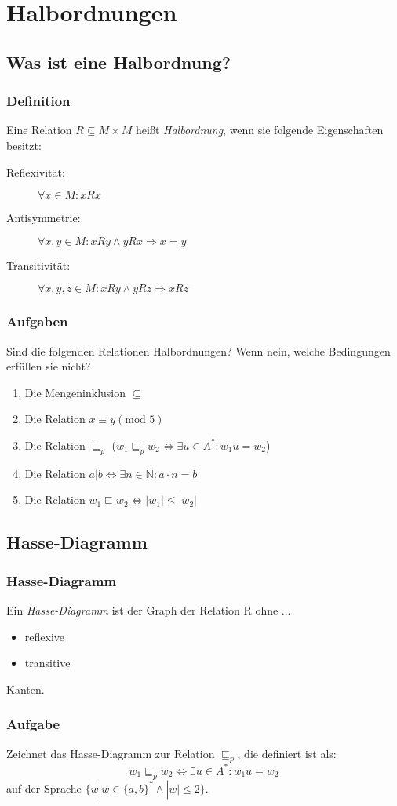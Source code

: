 \section{Halbordnungen}
\subsection{Was ist eine Halbordnung?}
\begin{frame}
	\frametitle{Definition}
	\begin{definition}
		Eine Relation $R\subseteq M\times M$ heißt \emph{Halbordnung}, wenn sie folgende Eigenschaften besitzt:
		\begin{description}
			\item[Reflexivität:] $\forall x \in M: xRx$
			\item[Antisymmetrie:] $\forall x,y \in M: xRy \wedge yRx \Rightarrow x = y$
			\item[Transitivität:] $\forall x,y,z \in M: xRy \wedge yRz \Rightarrow xRz$
		\end{description}
	\end{definition}
\end{frame}
\begin{frame}
	\frametitle{Aufgaben}
		Sind die folgenden Relationen Halbordnungen? Wenn nein, welche Bedingungen erfüllen sie nicht?
		\begin{enumerate}
			\item Die Mengeninklusion $\subseteq$ 
			\item Die Relation $x\equiv y (\text{mod }5)$ 
			\item Die Relation $\sqsubseteq_p$ ($w_1\sqsubseteq_pw_2\iff\exists u\in A^*:w_1u=w_2$) 
			\item Die Relation $a|b \iff \exists n\in \mathbb{N}:a\cdot n=b$ 
			\item Die Relation $w_1\sqsubseteq w_2 \iff |w_1|\leq |w_2|$ 
		\end{enumerate}
\end{frame}
\subsection{Hasse-Diagramm}
\begin{frame}
  \frametitle{Hasse-Diagramm}
	\begin{definition}
		Ein \emph{Hasse-Diagramm} ist der Graph der Relation R ohne $\dots$
    \begin{itemize}
      \item reflexive
      \item transitive
    \end{itemize}
    Kanten.
  \end{definition}
\end{frame}
\begin{frame}
  \frametitle{Aufgabe}
  Zeichnet das Hasse-Diagramm zur Relation $\sqsubseteq_p$, die definiert ist als:$$w_1\sqsubseteq_pw_2\iff\exists u\in A^*:w_1u=w_2$$ auf der Sprache $\{w|w\in \{a,b\}^* \wedge |w|\leq 2\}$.
\end{frame}
